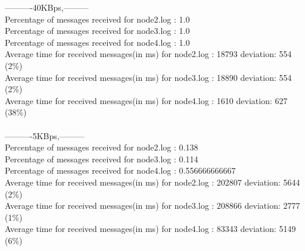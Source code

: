         ----------40KBps,---------\\
        Percentage of messages received for node2.log : 1.0\\
        Percentage of messages received for node3.log : 1.0\\
        Percentage of messages received for node4.log : 1.0\\
        Average time for received messages(in ms) for  node2.log : 18793    deviation: 554 (2\%)\\
        Average time for received messages(in ms) for  node3.log : 18890    deviation: 554 (2\%)\\
        Average time for received messages(in ms) for  node4.log : 1610     deviation: 627 (38\%)\\\\
        ----------5KBps,---------\\
        Percentage of messages received for node2.log : 0.138\\
        Percentage of messages received for node3.log : 0.114\\
        Percentage of messages received for node4.log : 0.556666666667\\
        Average time for received messages(in ms) for  node2.log : 202807   deviation: 5644 (2\%)\\
        Average time for received messages(in ms) for  node3.log : 208866   deviation: 2777 (1\%)\\
        Average time for received messages(in ms) for  node4.log : 83343    deviation: 5149 (6\%)\\

